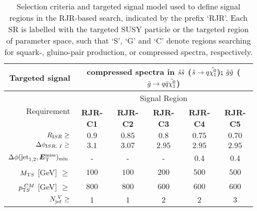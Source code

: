 {\begin{table}[H]
\begin{center}
\begin{tabular}{|r|c|c|c|c|c|}
\hline
       Targeted signal & \multicolumn{5}{c|}{ compressed spectra in $\tilde{s}\tilde{s}$ ($\tilde{s} \rightarrow q \tilde{\chi^0_1}$); $\tilde{g}\tilde{g}$ ($\tilde{g} \rightarrow q\bar{q} \tilde{\chi^0_1}$) } \\
       \hline \hline
      \multirow{2}{*}{Requirement}                                             & \multicolumn{5}{c|}{Signal Region}                                                           \\
 \cline{2-6}                                                                   & \textbf{ RJR-C1} & \textbf{ RJR-C2} & \textbf{ RJR-C3} & \textbf{ RJR-C4} & \textbf{ RJR-C5} \\
\hline
$R_{\textrm ISR} \geq $                                                        & $ 0.9$           & $ 0.85$          & $ 0.8$           & $ 0.75$          & $ 0.70$          \\ \hline
$ \Delta\phi_{\textrm ISR,~I} \geq$                                            & $ 3.1$           & $ 3.07$          & $ 2.95$          & $ 2.95$          & $ 2.95$          \\ \hline
$\Delta\phi(\textrm{jet}_{\textrm 1,2},\bm{E}\mathrm{^{miss}_T})_{\text{min}} \> $ & -                & -                & -                & 0.4              & 0.4              \\ \hline
$M_{\textrm T S}$ [GeV] $\geq$                                                 & $ 100$           & $ 100$           & $ 200$           & $ 500$           & $ 500$           \\ \hline
$p_{\textrm T S}^{\textrm ~CM}$ [GeV]  $\ge$                                   & $ 800$           & $ 800$           & $ 600$           & $ 600$           & $ 600$           \\ \hline
$N_{\textrm jet}^{\textrm ~V} \geq$                                            & $ 1$             & $ 1$             & $ 2$             & $ 2$             & $ 3$             \\
\hline

\end{tabular}

\caption{Selection criteria and targeted signal model used to define signal regions in the RJR-based search, indicated by the prefix `RJR'. Each SR is labelled with the targeted SUSY particle or the targeted region of parameter space, such that `S', `G' and `C' denote regions searching for squark-, gluino-pair production, or compressed spectra, respectively.
\label{tab:RJsrdefs}}
\end{center}
\end{table}

}